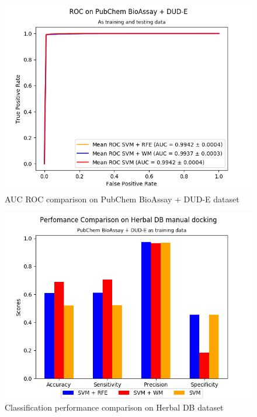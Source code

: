 \documentclass[conference,compsoc,12pt]{IEEEtran}
\begin{document}
\begin{figure}
	\includegraphics[scale=0.5]{../images/03-evaluate-1_roc_chart.png}
	\caption{AUC ROC comparison on PubChem BioAssay + DUD-E dataset}
	\label{fig_roc_comparison_pubchem}
\end{figure}


\begin{figure}
\includegraphics[scale=0.5]{../images/03-evaluate-3_scores_chart.png}
\caption{Classification performance comparison on Herbal DB dataset}
\label{fig_performance_comparison_herbaldb}
\end{figure}
\end{document}
